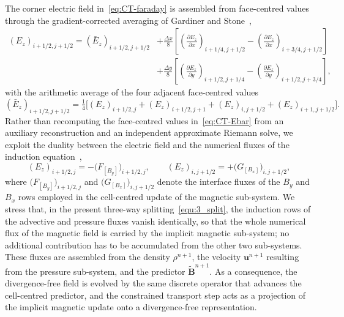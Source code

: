 \documentclass[a4paper,fleqn]{cas-sc}
\theoremstyle{definition}
\theoremstyle{remark}
\begin{document}
The corner electric field in~\eqref{eq:CT-faraday} is assembled from
face-centred values through the gradient-corrected averaging of Gardiner and
Stone~\cite{GardinerStone2005},
%
\begin{equation}
\label{eq:CT-corner-E}
\begin{aligned}
(E_z)_{i+1/2,j+1/2}
= (\bar E_z)_{i+1/2,j+1/2}
& + \frac{\Delta x}{8}\left[
   \left(\frac{\partial E_z}{\partial x}\right)_{i+1/4,j+1/2}
 - \left(\frac{\partial E_z}{\partial x}\right)_{i+3/4,j+1/2}\right]
\\& + \frac{\Delta y}{8}\left[
   \left(\frac{\partial E_z}{\partial y}\right)_{i+1/2,j+1/4}
 - \left(\frac{\partial E_z}{\partial y}\right)_{i+1/2,j+3/4}\right],
 \end{aligned}
\end{equation}
%
with the arithmetic average of the four adjacent face-centred values
%
\begin{equation}
\label{eq:CT-Ebar}
(\bar E_z)_{i+1/2,j+1/2}
= \tfrac14\Big[(E_z)_{i+1/2,j}+(E_z)_{i+1/2,j+1}
             +(E_z)_{i,j+1/2}+(E_z)_{i+1,j+1/2}\Big].
\end{equation}
%
Rather than recomputing the face-centred values in~\eqref{eq:CT-Ebar} from an
auxiliary reconstruction and an independent approximate Riemann solve, we
exploit the duality between the electric field and the numerical fluxes of the
induction equation~\cite{Dematte2024},
%
\begin{equation}
\label{eq:CT-duality}
(E_z)_{i+1/2,j} = -\big(F_{[B_y]}\big)_{i+1/2,j},
\qquad
(E_z)_{i,j+1/2} = +\big(G_{[B_x]}\big)_{i,j+1/2},
\end{equation}
%
where $\big(F_{[B_y]}\big)_{i+1/2,j}$ and $\big(G_{[B_x]}\big)_{i,j+1/2}$ denote
the interface fluxes of the $B_y$ and $B_x$ rows employed in the cell-centred
update of the magnetic sub-system. We stress that, in the present three-way
splitting~\eqref{equ:3_split}, the induction rows of the advective and pressure
fluxes vanish identically, so that the whole numerical flux of the
magnetic field is carried by the implicit magnetic sub-system; no additional
contribution has to be accumulated from the other two sub-systems. These fluxes
are assembled from the density $\rho^{n+1}$, the velocity $\mathbf u^{n+1}$
resulting from the pressure sub-system, and the predictor
$\tilde{\mathbf B}^{n+1}$. As a consequence, the divergence-free field is
evolved by the same discrete operator that advances the cell-centred predictor,
and the constrained transport step acts as a projection of the implicit magnetic
update onto a divergence-free representation.
\end{document}

